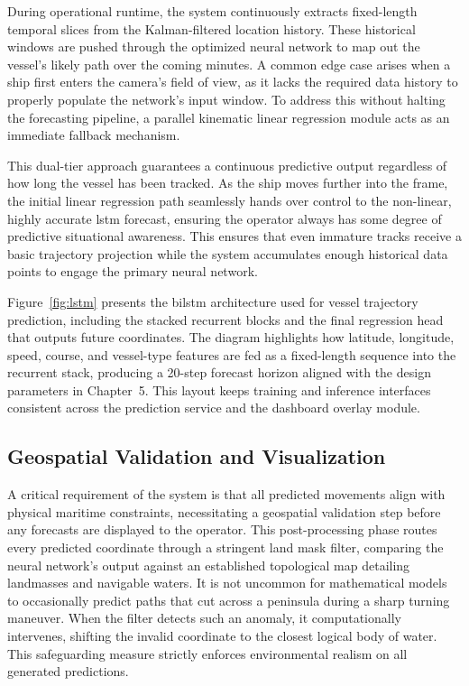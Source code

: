 During operational runtime, the system continuously extracts fixed-length temporal slices from the Kalman-filtered location history. These historical windows are pushed through the optimized neural network to map out the vessel's likely path over the coming minutes. A common edge case arises when a ship first enters the camera's field of view, as it lacks the required data history to properly populate the network's input window. To address this without halting the forecasting pipeline, a parallel kinematic linear regression module acts as an immediate fallback mechanism. 

This dual-tier approach guarantees a continuous predictive output regardless of how long the vessel has been tracked. As the ship moves further into the frame, the initial linear regression path seamlessly hands over control to the non-linear, highly accurate \gls{lstm} forecast, ensuring the operator always has some degree of predictive situational awareness. This ensures that even immature tracks receive a basic trajectory projection while the system accumulates enough historical data points to engage the primary neural network.
\begin{reportfigblock}
Figure~\ref{fig:lstm} presents the \gls{bilstm} architecture used for vessel trajectory prediction, including the stacked recurrent blocks and the final regression head that outputs future coordinates.
The diagram highlights how latitude, longitude, speed, course, and vessel-type features are fed as a fixed-length sequence into the recurrent stack, producing a 20-step forecast horizon aligned with the design parameters in Chapter~5. This layout keeps training and inference interfaces consistent across the prediction service and the dashboard overlay module.
\end{reportfigblock}

\subsection{Geospatial Validation and Visualization}

A critical requirement of the system is that all predicted movements align with physical maritime constraints, necessitating a geospatial validation step before any forecasts are displayed to the operator. This post-processing phase routes every predicted coordinate through a stringent land mask filter, comparing the neural network's output against an established topological map detailing landmasses and navigable waters. It is not uncommon for mathematical models to occasionally predict paths that cut across a peninsula during a sharp turning maneuver. When the filter detects such an anomaly, it computationally intervenes, shifting the invalid coordinate to the closest logical body of water. This safeguarding measure strictly enforces environmental realism on all generated predictions.

